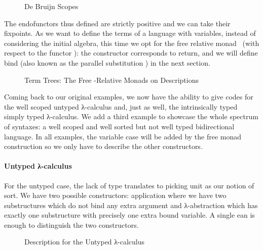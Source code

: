 \begin{figure}[h]
\caption{De Bruijn Scopes}\label{figure:debruijnscope}
\end{figure}

The endofunctors thus defined are strictly positive and we can take their fixpoints.
As we want to define the terms of a language with variables, instead of
considering the initial algebra, this time we opt for the free relative
monad~\cite{JFR4389} (with respect to the functor ): the 
constructor corresponds to return, and we will define bind (also known as
the parallel substitution ) in the next section.


\begin{figure}[h]
\caption{Term Trees: The Free -Relative Monads on Descriptions}\label{figure:freemonad}
\end{figure}

Coming back to our original examples, we now have the ability to give
codes for the well scoped untyped λ-calculus and, just as well,
the intrinsically typed simply typed λ-calculus. We add a third
example to showcase the whole spectrum of syntaxes: a well scoped and
well sorted but not well typed bidirectional language. In all examples,
the variable case will be added by the free monad construction so we only
have to describe the other constructors.


\paragraph{Untyped λ-calculus} For the untyped case, the lack of
type translates to picking unit as our notion of sort. We have two possible
constructors: application where we have two substructures which do not bind
any extra argument and λ-abstraction which has exactly one substructure
with precisely one extra bound variable. A single ean is enough to
distinguish the two constructors.

\begin{figure}[h]
  \caption{Description for the Untyped λ-calculus}
\end{figure}

